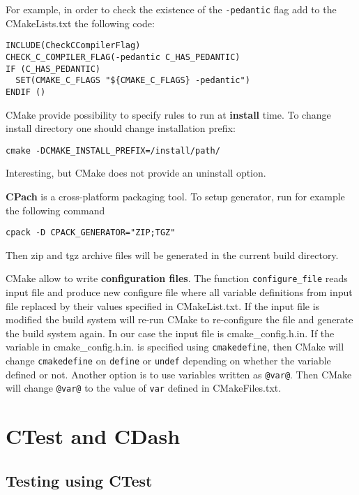 \documentclass[a4paper,10pt]{article}
\begin{document}
For example, in order to check the existence of the \texttt{-pedantic} flag add to the CMakeLists.txt the following code:

\begin{verbatim}
INCLUDE(CheckCCompilerFlag)
CHECK_C_COMPILER_FLAG(-pedantic C_HAS_PEDANTIC)
IF (C_HAS_PEDANTIC)
  SET(CMAKE_C_FLAGS "${CMAKE_C_FLAGS} -pedantic")
ENDIF ()
\end{verbatim}


CMake provide possibility to specify rules to run at \textbf{install} time. 
To change install directory one should change installation prefix:
\begin{verbatim}
cmake -DCMAKE_INSTALL_PREFIX=/install/path/
\end{verbatim}
Interesting, but CMake does not provide an uninstall option. 



\textbf{CPach} is a cross-platform packaging tool. To setup generator, run for example the following command
\begin{verbatim}
cpack -D CPACK_GENERATOR="ZIP;TGZ" 
\end{verbatim}
Then zip and tgz archive files will be generated in the current build directory.



CMake allow to write \textbf{configuration files}. The function \texttt{configure\_file} reads input file and produce new configure file where all variable definitions from input file replaced by their values specified in CMakeList.txt. If the input file is modified the build system will re-run CMake to re-configure the file and generate the build system again. In our case the input file is cmake\_config.h.in.
If the variable in cmake\_config.h.in. is specified using \texttt{cmakedefine}, then CMake will change \texttt{cmakedefine} on \texttt{define} or \texttt{undef} depending on whether the variable defined or not. Another option is to use variables written as \texttt{@var@}. Then CMake will change \texttt{@var@} to the value of \texttt{var} defined in CMakeFiles.txt.




\section{CTest and CDash}

\subsection{Testing using CTest}
\end{document}
